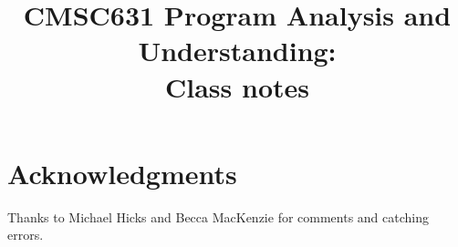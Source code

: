 \documentclass[11pt]{article}
\title{CMSC631 Program Analysis and Understanding:\\
  Class notes}
\begin{document}
\maketitle
\tableofcontents


\newpage


\newpage




% 

\appendix
\section{Acknowledgments}

Thanks to Michael Hicks and Becca MacKenzie for comments and catching errors.
\end{document}
